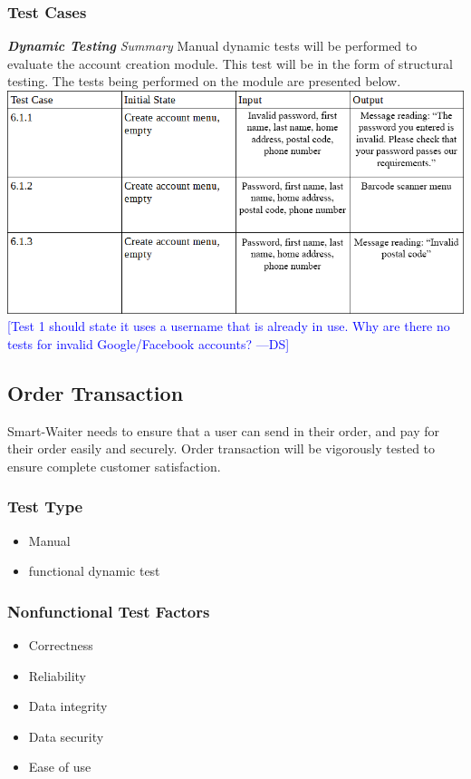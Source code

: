 \documentclass[12pt]{article}
\newcommand{\authornote}[3]{\textcolor{#1}{[#3 ---#2]}}
\newcommand{\authornote}[3]{}
\newcommand{\ds}[1]{\authornote{blue}{DS}{#1}}
\begin{document}
\subsubsection{Test Cases}
\textbf{\textit{Dynamic Testing}}\newline
\newline
\textit{Summary}\newline
Manual dynamic tests will be performed to evaluate the account creation module. This test will be in the form of structural testing. The tests being performed on the module are presented below. 
\newline
\includegraphics[width=\textwidth,height=\textheight,keepaspectratio]{accountTC.png}
\ds{Test 1 should state it uses a username that is already in use. Why are
there no tests for invalid Google/Facebook accounts?}

\subsection{Order Transaction}
Smart-Waiter needs to ensure that a user can send in their order, and pay for their order easily and securely. Order transaction will be vigorously tested to ensure complete customer satisfaction.  
\subsubsection{Test Type}
\begin{itemize}
  \item Manual 
  \item functional dynamic test 
 \end{itemize} 
\subsubsection{Nonfunctional Test Factors}
\begin{itemize}
  \item Correctness 
  \item Reliability 
  \item Data integrity 
  \item Data security 
  \item Ease of use
 \end{itemize} 
\end{document}

